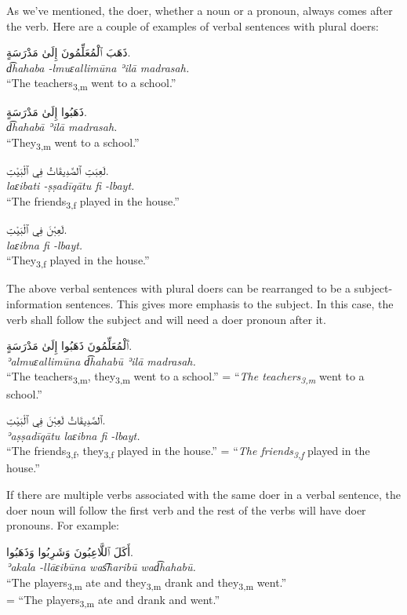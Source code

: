 \documentclass[
  10pt,
]{book}
\begin{document}
As we've mentioned, the doer, whether a noun or a pronoun, always comes after the verb. Here are a couple of examples of verbal sentences with plural doers:

\foreignlanguage{arabic}{ذَهَبَ ٱلْمُعَلِّمُونَ إِلَىٰ مَدْرَسَةٍ.}\\
\emph{d͡hahaba -lmuɛallimūna ʾilā madrasah.}\\
\enquote{The teachers\textsubscript{3,m} went to a school.}

\foreignlanguage{arabic}{ذَهَبُوا إِلَىٰ مَدْرَسَةٍ.}\\
\emph{d͡hahabā ʾilā madrasah.}\\
\enquote{They\textsubscript{3,m} went to a school.}

\foreignlanguage{arabic}{لَعِبَتِ ٱلصَّدِيقَاتُ فِي ٱلْبَيْتِ.}\\
\emph{laɛibati -ṣṣadīqātu fi -lbayt.}\\
\enquote{The friends\textsubscript{3,f} played in the house.}

\foreignlanguage{arabic}{لَعِبْنَ فِي ٱلْبَيْتِ.}\\
\emph{laɛibna fi -lbayt.}\\
\enquote{They\textsubscript{3,f} played in the house.}

The above verbal sentences with plural doers can be rearranged to be a subject-information sentences. This gives more emphasis to the subject. In this case, the verb shall follow the subject and will need a doer pronoun after it.

\foreignlanguage{arabic}{ٱَلْمُعَلِّمُونَ ذَهَبُوا إِلَىٰ مَدْرَسَةٍ.}\\
\emph{ʾalmuɛallimūna d͡hahabū ʾilā madrasah.}\\
\enquote{The teachers\textsubscript{3,m}, they\textsubscript{3,m} went to a school.}
= \enquote{\emph{The teachers\textsubscript{3,m}} went to a school.}

\foreignlanguage{arabic}{ٱلصَّدِيقَاتُ لَعِبْنَ فِي ٱلْبَيْتِ.}\\
\emph{ʾaṣṣadīqātu laɛibna fi -lbayt.}\\
\enquote{The friends\textsubscript{3,f}, they\textsubscript{3,f} played in the house.}
= \enquote{\emph{The friends\textsubscript{3,f}} played in the house.}

If there are multiple verbs associated with the same doer in a verbal sentence, the doer noun will follow the first verb and the rest of the verbs will have doer pronouns. For example:

\foreignlanguage{arabic}{أَکَلَ ٱللَّاعِبُونَ وَشَرِبُوا وَذَهَبُوا.}\\
\emph{ʾakala -llāɛibūna was͡haribū wad͡hahabū.}\\
\enquote{The players\textsubscript{3,m} ate and they\textsubscript{3,m} drank and they\textsubscript{3,m} went.}\\
= \enquote{The players\textsubscript{3,m} ate and drank and went.}
\end{document}
